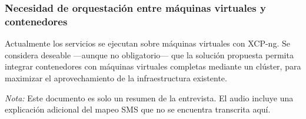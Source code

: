 \subsubsection{Necesidad de orquestación entre máquinas virtuales y contenedores}
Actualmente los servicios se ejecutan sobre máquinas virtuales con XCP-ng. Se considera deseable —aunque no obligatorio— que la solución propuesta permita integrar contenedores con máquinas virtuales completas mediante un clúster, para maximizar el aprovechamiento de la infraestructura existente.

\bigskip
\noindent \textit{Nota:} Este documento es solo un resumen de la entrevista. El audio incluye una explicación adicional del mapeo SMS que no se encuentra transcrita aquí.